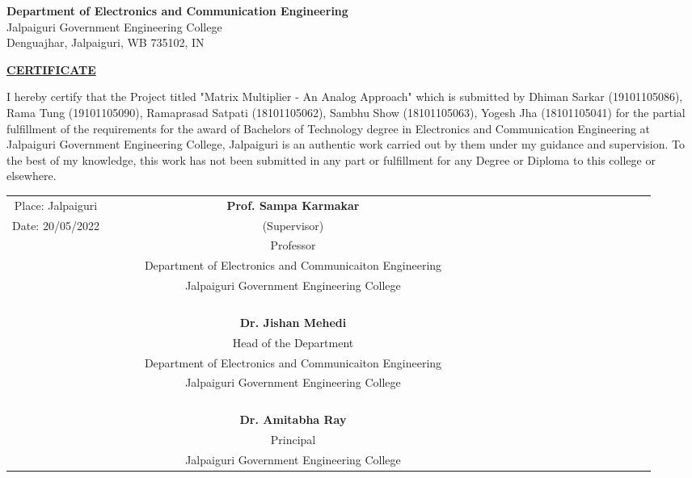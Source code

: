 \begin{center}
	\textbf{\large Department of Electronics and Communication Engineering\\}
	{\large Jalpaiguri Government Engineering College\\}
	{Denguajhar, Jalpaiguri, WB 735102, IN\\}
	
	\vspace{2cm}
	
	\textbf{\large \underline{CERTIFICATE}\\}
	
\end{center}

I hereby certify that the Project titled "Matrix Multiplier - An Analog Approach" which is submitted by Dhiman Sarkar (19101105086),  Rama Tung (19101105090), Ramaprasad Satpati (18101105062), Sambhu Show (18101105063), Yogesh Jha (18101105041) for the partial fulfillment of the requirements for the award of Bachelors of Technology degree in Electronics and Communication Engineering at Jalpaiguri Government Engineering College, Jalpaiguri is an authentic work carried out by them under my guidance and supervision. To the best of my knowledge, this work has not been submitted in any part or fulfillment for any Degree or Diploma to this college or elsewhere.


	\vspace{3cm}


\begin{tabular}{ c c c c c c c c c c c c c c c c c c c c c c c    } 
	
	Place: Jalpaiguri 	&&&&	\textbf{Prof. Sampa Karmakar}\\
	Date: 20/05/2022 	&&&&	(Supervisor)\\
						&&&& Professor\\
						&&&& Department of Electronics and Communicaiton Engineering\\
						&&&& Jalpaiguri Government Engineering College\\
						&&&& \\
						&&&& \\
						&&&& \\
						&&&& \\
						&&&&	\textbf{Dr. Jishan Mehedi}\\
						&&&& Head of the Department\\
						&&&& Department of Electronics and Communicaiton Engineering\\
						&&&& Jalpaiguri Government Engineering College\\
						&&&& \\
						&&&& \\
						&&&& \\
						&&&& \\
						&&&&	\textbf{Dr. Amitabha Ray}\\
						&&&& Principal\\
						&&&& Jalpaiguri Government Engineering College\\
\end{tabular}